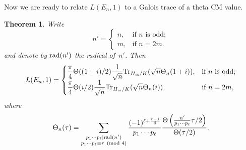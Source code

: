 \documentclass[11pt, reqno]{amsart}
\theoremstyle{plain}
\newtheorem{theorem}{Theorem}[section]
\theoremstyle{definition}
\numberwithin{equation}{section}
\begin{document}
 Now we are ready to relate $L(E_{n},1)$ to a Galois trace of a theta CM value.


\begin{theorem}\label{main2}
Write 
$$
n'=\begin{cases}
    n,&\mbox{if $n$ is odd};\\
    m,&\mbox{if $n=2m$.}
\end{cases}
$$
and denote by ${\rm rad}(n')$ the radical of~$n'$. Then
$$
L(E_{n},1)=\begin{cases}
    \displaystyle{\frac{\pi}{4}\Theta((1+i)/2)\frac{1}{\sqrt{n}}{\rm Tr}_{H_{\mathfrak{m}}/K}(\sqrt{n}\Theta_{n}(1+i))},&\mbox{if $n$ is odd};\\
    \displaystyle{\frac{\pi}{4}\Theta(i/2)\frac{1}{\sqrt{n}}{\rm Tr}_{H_{\mathfrak{m}}/K}(\sqrt{n}\Theta_{n}(i))},&\mbox{if $n=2m$},
\end{cases}
$$
    where
    $$
    \Theta_{n}(\tau)=\sum_{\substack{p_{1}\cdots p_{\ell}|{\rm rad}(n')\\ p_{1}\cdots p_{\ell}\equiv r\pmod{4}}}\frac{(-1)^{\ell+\frac{r-1}{2}}}{p_{1}\cdots p_{\ell}}\frac{\Theta\left(\frac{n'}{p_{1}\cdots p_{\ell}}\tau/2\right)}{\Theta(\tau/2)}.
    $$
\end{theorem}
\end{document}
